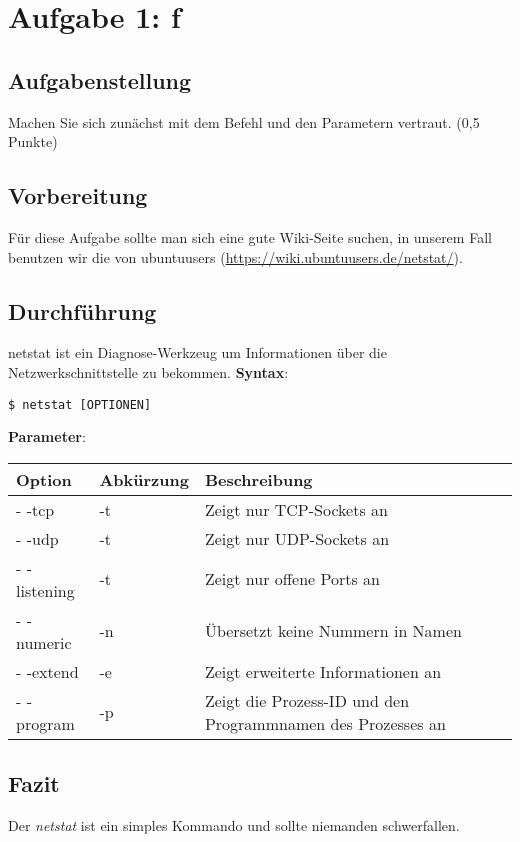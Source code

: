 \newpage

\section{Aufgabe 1: f}

\subsection{Aufgabenstellung}
Machen Sie sich zunächst mit dem Befehl und den Parametern vertraut. (0,5 Punkte)

\subsection{Vorbereitung}
Für diese Aufgabe sollte man sich eine gute Wiki-Seite suchen, in unserem Fall benutzen wir die von ubuntuusers (\url{https://wiki.ubuntuusers.de/netstat/}).

\subsection{Durchführung}
netstat ist ein Diagnose-Werkzeug um Informationen über die Netzwerkschnittstelle zu bekommen.
\textbf{Syntax}: 
\begin{lstlisting}
$ netstat [OPTIONEN]
\end{lstlisting}
\textbf{Parameter}: 
\begin{table}[H]
	\tablestyle
	\begin{tabular}{lll}
		\toprule
			Option & Abkürzung & Beschreibung \tabularnewline
				
		\midrule
			- -tcp & -t & Zeigt nur TCP-Sockets an\tabularnewline
			- -udp & -t & Zeigt nur UDP-Sockets an\tabularnewline
			- -listening & -t & Zeigt nur offene Ports an\tabularnewline
			- -numeric & -n & Übersetzt keine Nummern in Namen\tabularnewline
			- -extend & -e & Zeigt erweiterte Informationen an\tabularnewline
			- -program & -p & Zeigt die Prozess-ID und den Programmnamen des Prozesses an\tabularnewline
			
	\end{tabular}
\end{table}
 
\subsection{Fazit}
Der \textit{netstat} ist ein simples Kommando und sollte niemanden schwerfallen.